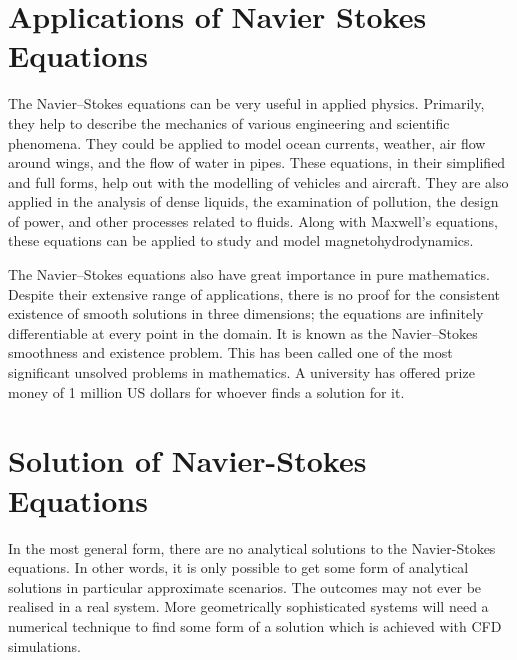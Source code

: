 \documentclass{article}
\begin{document}
\section{Applications of Navier Stokes Equations}
The Navier–Stokes equations can be very useful in applied physics. Primarily, they help to describe the mechanics of various engineering and scientific phenomena. They could be applied to model ocean currents, weather, air flow around wings, and the flow of water in pipes. These equations, in their simplified and full forms, help out with the modelling of vehicles and aircraft. They are also applied in the analysis of dense liquids, the examination of pollution, the design of power, and other processes related to fluids. Along with Maxwell’s equations, these equations can be applied to study and model magnetohydrodynamics.


The Navier–Stokes equations also have great importance in pure mathematics. Despite their extensive range of applications, there is no proof for the consistent existence of smooth solutions in three dimensions; the equations are infinitely differentiable at every point in the domain. It is known as the Navier–Stokes smoothness and existence problem. This has been called one of the most significant unsolved problems in mathematics. A university has offered prize money of 1 million US dollars for whoever finds a solution for it.

\section{Solution of Navier-Stokes Equations
}
In the most general form, there are no analytical solutions to the Navier-Stokes equations. In other words, it is only possible to get some form of analytical solutions in particular approximate scenarios\cite{https://doi.org/10.6084/m9.figshare.5668657.v1}. The outcomes may not ever be realised in a real system. More geometrically sophisticated systems will need a numerical technique to find some form of a solution which is achieved with CFD simulations.

\newpage


\end{document}
